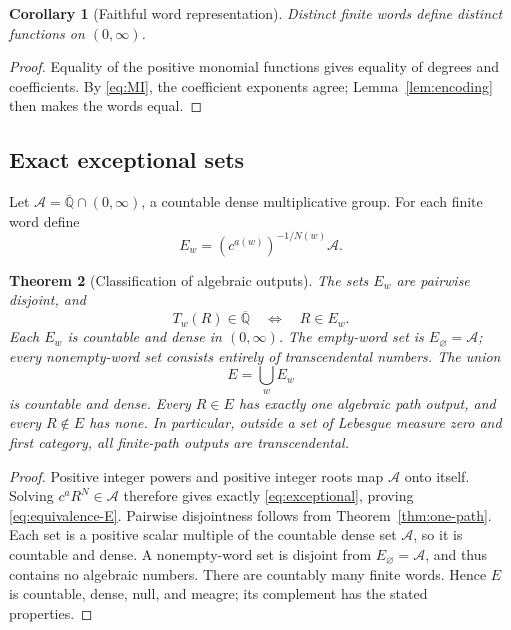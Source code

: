 \documentclass[11pt,a4paper]{article}
\numberwithin{equation}{section}
\newtheorem{theorem}{Theorem}[section]
\newtheorem{corollary}[theorem]{Corollary}
\theoremstyle{definition}
\theoremstyle{remark}
\newcommand{\Qbar}{\overline{\mathbb Q}}
\newcommand{\Apos}{\mathcal A}
\begin{document}
\begin{corollary}[Faithful word representation]\label{cor:faithful}
Distinct finite words define distinct functions on $(0,\infty)$.
\end{corollary}
\begin{proof}
Equality of the positive monomial functions gives equality of degrees and coefficients. By \eqref{eq:MI}, the coefficient exponents agree; Lemma~\ref{lem:encoding} then makes the words equal.
\end{proof}

\subsection{Exact exceptional sets}

Let $\Apos=\Qbar\cap(0,\infty)$, a countable dense multiplicative group. For each finite word define
\begin{equation}\label{eq:exceptional}
 E_w=(c^{a(w)})^{-1/N(w)}\Apos.
\end{equation}

\begin{theorem}[Classification of algebraic outputs]\label{thm:exceptional}
The sets $E_w$ are pairwise disjoint, and
\begin{equation}\label{eq:equivalence-E}
 T_w(R)\in\Qbar\quad\Longleftrightarrow\quad R\in E_w.
\end{equation}
Each $E_w$ is countable and dense in $(0,\infty)$. The empty-word set is $E_{\varnothing}=\Apos$; every nonempty-word set consists entirely of transcendental numbers. The union
\[
 E=\bigcup_w E_w
\]
is countable and dense. Every $R\in E$ has exactly one algebraic path output, and every $R\notin E$ has none. In particular, outside a set of Lebesgue measure zero and first category, all finite-path outputs are transcendental.
\end{theorem}
\begin{proof}
Positive integer powers and positive integer roots map $\Apos$ onto itself. Solving $c^aR^N\in\Apos$ therefore gives exactly \eqref{eq:exceptional}, proving \eqref{eq:equivalence-E}. Pairwise disjointness follows from Theorem~\ref{thm:one-path}. Each set is a positive scalar multiple of the countable dense set $\Apos$, so it is countable and dense. A nonempty-word set is disjoint from $E_{\varnothing}=\Apos$, and thus contains no algebraic numbers. There are countably many finite words. Hence $E$ is countable, dense, null, and meagre; its complement has the stated properties.
\end{proof}
\end{document}
